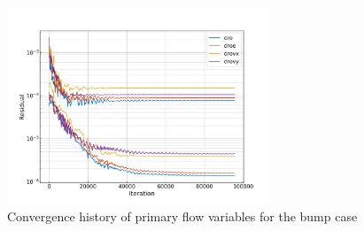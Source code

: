 \documentclass{article}
\begin{document}
\begin{figure}[H]
    \centering
    \includegraphics[width=0.7\textwidth]{figures/bump_conv.png}
    \caption{Convergence history of primary flow variables for the bump case}
    \label{fig:bump_conv}
\end{figure}
\end{document}
